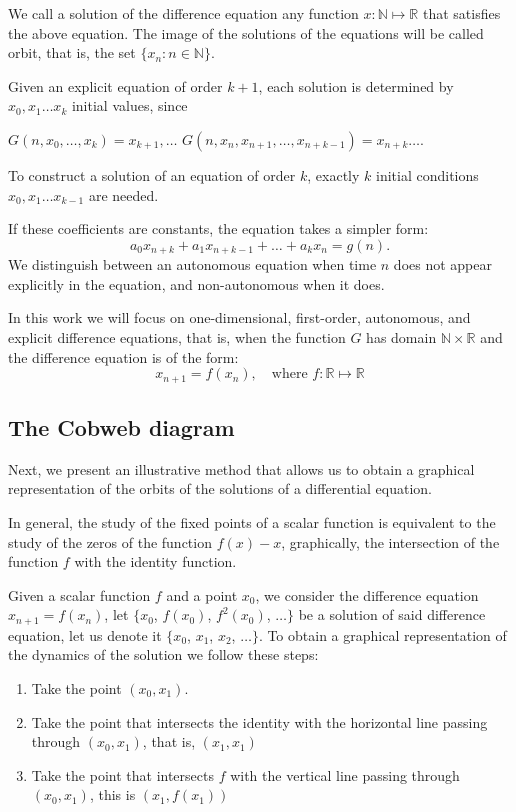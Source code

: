\documentclass[12pt,a4paper]{report}
\theoremstyle{definition}
\begin{document}
We call a solution of the difference equation any function 
$
x : \mathbb{N} \mapsto \mathbb{R}
$ 
that satisfies the above equation.
The image of the solutions of the equations will be called orbit, that is, the set $\{x_n\colon n\in\mathbb{N} \}$. 

Given an explicit equation of order $k+1$, each solution is determined by $x_0, x_1 \ldots x_{k}$ initial values, since 

$G(n,x_{0}, \ldots, x_{k}) = x_{k + 1}, \ldots$  
$ G(n, x_n,x_{n+1}, \ldots, x_{n+k-1}) = x_{n+k} \ldots$.

To construct a solution of an equation of order $k$, exactly $k$ initial conditions $x_0, x_1 \ldots x_{k-1}$ are needed. 

If these coefficients are constants, the equation takes a simpler form:
\[
a_0x_{n+k} + a_1x_{n+k-1} + \dots + a_kx_{n} = g(n).
\]
%
We distinguish between an autonomous equation when time $n$ does not appear explicitly in the equation, and non-autonomous when it does.

In this work we will focus on one-dimensional, first-order, autonomous, and explicit difference equations, that is, when the function $G$ has domain $\mathbb{N} \times \mathbb{R}$ and the difference equation is of the form:
\[x_{n+1} = f(x_n),\quad \text{where } f : \mathbb{R} \mapsto  \mathbb{R} \]

\subsection{The Cobweb diagram}

Next, we present an illustrative method that allows us to obtain a graphical representation of the orbits of the solutions of a differential equation.

In general, the study of the fixed points of a scalar function is equivalent to the study of the zeros of the function $f(x) - x $, graphically, the intersection of the function $f$ with the identity function.

Given a scalar function $f$ and a point $x_0$, we consider the difference equation $x_{n+1} = f(x_n)$, let $\{ x_0$, $f(x_0)$, $f^2(x_0)$, $\ldots \}$ be a solution of said difference equation, let us denote it $ \{ x_0$, $x_1$, $x_2 $, $\ldots \}$. To obtain a graphical representation of the dynamics of the solution we follow these steps:

\begin{enumerate}
    \item Take the point $(x_0,x_1)$.
    \item Take the point that intersects the identity with the horizontal line passing through $(x_0,x_1)$, that is, $(x_1,x_1)$
    \item Take the point that intersects $f$ with the vertical line passing through $(x_0,x_1)$, this is $(x_1,f(x_1))$
\end{enumerate}
\end{document}
